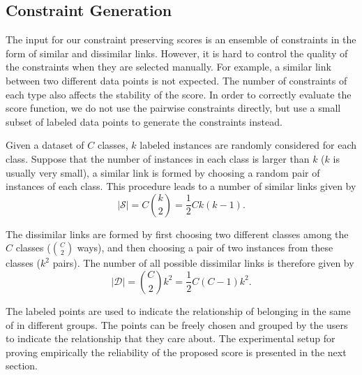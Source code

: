 \subsection{Constraint Generation}\label{sec:xp:constraint}

The input for our constraint preserving scores is an ensemble of constraints in the form of similar and dissimilar links.
However, it is hard to control the quality of the constraints when they are selected manually.
For example, a similar link between two different data points is not expected.
The number of constraints of each type also affects the stability of the score.
In order to correctly evaluate the score function, we do not use the pairwise constraints directly, but use a small subset of labeled data points to generate the constraints instead.

Given a dataset of $C$ classes, $k$ labeled instances are randomly considered for each class.
Suppose that the number of instances in each class is larger than $k$ ($k$ is usually very small),
a similar link is formed by choosing a random pair of instances of each class.
This procedure leads to a number of similar links given by
\begin{equation}\label{eq:|S|}
    |\mathcal{S}| = C {k \choose 2} = \frac{1}{2} C k (k - 1).
\end{equation}

The dissimilar links are formed by first choosing two different classes among the $C$ classes (${C \choose 2}$ ways),
and then choosing a pair of two instances from these classes ($k^2$ pairs).
The number of all possible dissimilar links is therefore given by
\begin{equation}\label{eq:|D|}
    |\mathcal{D}| = {C \choose 2} k^2 = \frac{1}{2} C (C - 1) k^2.
\end{equation}

The labeled points are used to indicate the relationship of belonging in the same of in different groups.
The points can be freely chosen and grouped by the users to indicate the relationship that they care about.
The experimental setup for proving empirically the reliability of the proposed score is presented in the next section.

